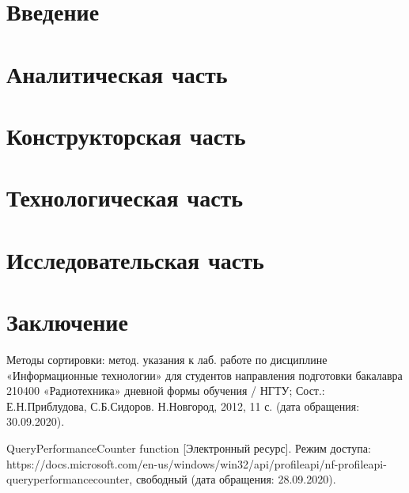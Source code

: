 \documentclass[10pt,a4paper]{report}
\begin{document}
	\renewcommand\bibname{Список литературы}
	
	
	
	\tableofcontents
	\newpage

	\chapter*{Введение}
	
	\newpage

	\chapter{Аналитическая часть}
	
	\newpage
	
	\chapter{Конструкторская часть}
	
	\newpage

	\chapter{Технологическая  часть}
			
	\newpage
	
	\chapter*{Исследовательская часть}
	\setcounter{chapter}{4}
	
	\newpage
	
	\chapter*{Заключение}
	
	\newpage
	
	\makeatletter %
	\def\@biblabel#1{#1. }
	\makeatother
	\begin{thebibliography}{2}
		 Методы сортировки: метод. указания к лаб. работе по дисциплине «Информационные технологии» для студентов направления подготовки бакалавра 210400 «Радиотехника» дневной формы обучения / НГТУ; Сост.: Е.Н.Приблудова, С.Б.Сидоров. Н.Новгород, 2012, 11 с. (дата обращения: 30.09.2020).
		
		 QueryPerformanceCounter function [Электронный ресурс]. Режим доступа: https://docs.microsoft.com/en-us/windows/win32/api/profileapi/nf-profileapi-queryperformancecounter, свободный (дата обращения: 28.09.2020).
	\end{thebibliography}
\end{document}
